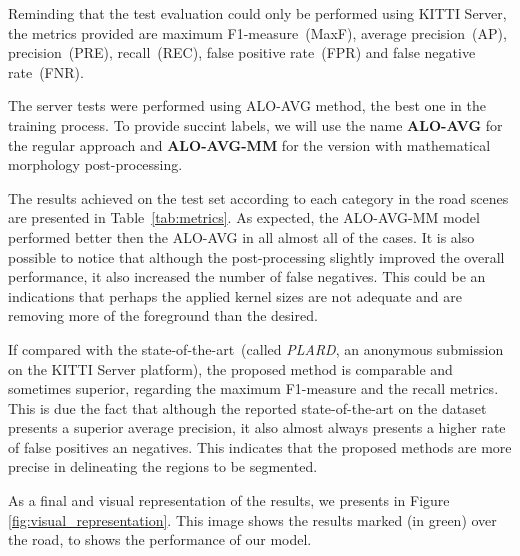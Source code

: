Reminding that the test evaluation could only be performed using KITTI Server, the metrics provided are maximum F1-measure~(MaxF), average precision~(AP), precision~(PRE), recall~(REC), false positive rate~(FPR) and false negative rate~(FNR). 

The server tests were performed using ALO-AVG method, the best one in the training process. To provide succint labels, we will use the name \textbf{ALO-AVG} for the regular approach and \textbf{ALO-AVG-MM} for the version with mathematical morphology post-processing. 

The results achieved  on the test set according to each category in the road scenes are presented in Table~\ref{tab:metrics}. As expected, the ALO-AVG-MM model performed better then the ALO-AVG in all almost all of the cases. {\color{red}It is also possible to notice that although the post-processing slightly improved the overall performance, it also increased the number of false negatives. This could be an indications that perhaps the applied kernel sizes are not adequate and are removing more of the foreground than the desired.}

If compared with the state-of-the-art~(called \textit{PLARD}, an anonymous submission on the KITTI Server platform), the proposed method is comparable and sometimes superior, regarding the maximum F1-measure and the recall metrics. This is due the fact that although the reported state-of-the-art on the dataset presents a superior average precision, it also almost always presents a higher rate of false positives an negatives. This indicates that the proposed methods are more precise in delineating the regions to be segmented.



As a final and visual representation of the results, we presents in Figure \ref{fig:visual_representation}. This image shows the results marked (in green) over the road, to shows the performance of our model.

